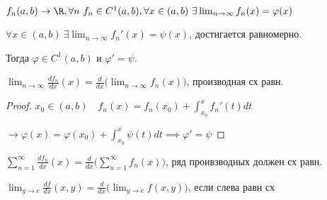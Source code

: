   \begin{theorem}%
    $f_n(a,b) \to \R, \forall n \ f_n \in C^1(a,b), \forall x \in (a,b) \ \exists \lim_{n\to\infty}f_n(x) = \varphi(x)$

    $\forall x \in (a,b) \ \exists \lim_{n\to\infty} f_n'(x) = \psi(x)$, достигается равномерно.

    Тогда $\varphi \in C^1(a,b)$ и $\varphi' = \psi$.

    $\lim_{n\to\infty} \frac{df_n}{dx}(x) = \frac{d}{dx}\big(\lim_{n\to\infty}f_n(x)\big)$, производная сх равн.
  \end{theorem}
  \begin{proof}
    $x_0 \in (a,b) \quad f_n(x) = f_n(x_0) + \int^x_{x_0}f_n'(t)dt$

    $\longrightarrow \varphi(x) = \varphi(x_0) + \int^x_{x_0} \psi(t)dt \implies \varphi' = \psi$
  \end{proof}

  \begin{corollary} %
    $\sum_{n=1}^\infty\frac{df_n}{dx}(x) = \frac{d}{dx}\big(\sum^\infty_{n=1}f_n(x)\big)$, ряд проивзводных должен сх равн.
  \end{corollary}

  \begin{corollary}
    $\lim_{y\to c} \frac{df}{dx}(x,y) = \frac{d}{dx}\big(\lim_{y\to c}f(x,y) \big)$, если слева равн сх
  \end{corollary}

